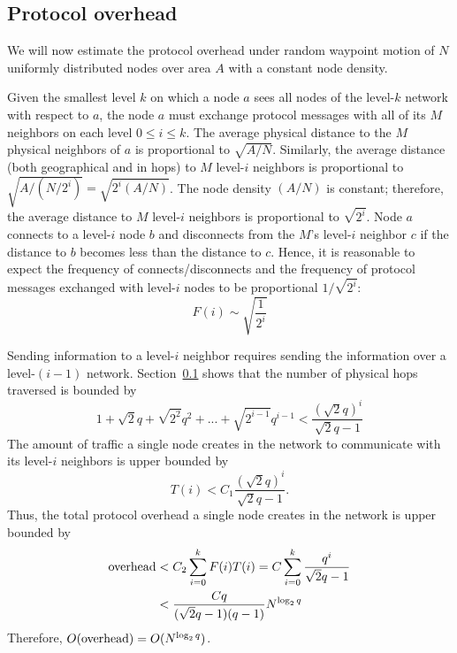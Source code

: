 \documentclass[conference]{IEEEtran}
\theoremstyle{definition}
\begin{document}
\subsection{Protocol overhead}
\label{sec:analysis:overhead}

We will now  estimate the protocol overhead under random waypoint motion of $N$ uniformly distributed nodes over area $A$ with a constant node density.

Given the smallest level $k$ on which a node $a$ sees all nodes of the level-$k$ network with respect to $a$, the node $a$ must exchange protocol messages with all of its $M$ neighbors on each level $0 \le i \le k$. The average physical distance to the $M$ physical neighbors of $a$ is proportional to $\sqrt{A / N}$. Similarly, the average distance (both geographical and in hops) to $M$ level-$i$ neighbors is proportional to $\sqrt{A / (N / 2^i)} = \sqrt{2^i (A / N)}$. The node density $(A / N)$ is constant; therefore, the average distance to $M$ level-$i$ neighbors is proportional to $\sqrt{2^i}$. Node $a$ connects to a level-$i$ node $b$ and disconnects from the $M$'s level-$i$ neighbor $c$ if the distance to $b$ becomes less than the distance to $c$. Hence, it is reasonable to expect the frequency of connects/disconnects and the frequency of protocol messages exchanged with level-$i$ nodes to be proportional $1 / \sqrt{2^i}$:
%
\begin{equation*}
    F(i) \sim \sqrt{\frac{1}{2^i}}
\end{equation*}

Sending information to a level-$i$ neighbor requires sending the information over
a level-$(i - 1)$ network. Section~\ref{sec:analysis:overhead} shows that the number of physical hops traversed is bounded by 
\begin{equation*}
    1 + \sqrt{2} q + \sqrt{2^2} q^2  + ... + \sqrt{2^{i-1}} q^{i-1} < \frac{ (\sqrt{2}q)^i }{\sqrt{2}q - 1}
\end{equation*}
%
The amount of traffic a single node creates in the network to communicate
with its level-$i$ neighbors is upper bounded by
%
\begin{equation*}
    T(i) < C_1 \frac{ (\sqrt{2}q)^i }{\sqrt{2}q - 1} .
\end{equation*}
Thus, the total protocol overhead a single node creates in the network is 
upper bounded by
%
\begin{align*}
    {\rm overhead} & < C_2 \sum_{i = 0}^{k} F(i)T(i) 
    	 = C \sum_{i = 0}^{k} \frac{q^i}{\sqrt{2}q - 1}   \\
     & < \frac{C q}{ (\sqrt{2}q - 1)(q - 1) } N^{\log_2q}
\end{align*}
Therefore, $O({\rm overhead}) = O(N^{\log_2 q} )$.
%
%
\end{document}
